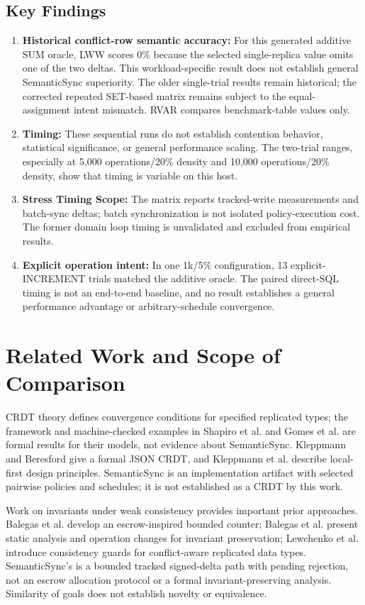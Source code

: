 \documentclass[runningheads]{llncs}
\begin{document}
\subsection{Key Findings}
\begin{enumerate}
\item \textbf{Historical conflict-row semantic accuracy:} For this generated additive SUM oracle, LWW scores 0\% because the selected single-replica value omits one of the two deltas. This workload-specific result does not establish general SemanticSync superiority. The older single-trial results remain historical; the corrected repeated SET-based matrix remains subject to the equal-assignment intent mismatch. RVAR compares benchmark-table values only.
\item \textbf{Timing:} These sequential runs do not establish contention behavior, statistical significance, or general performance scaling. The two-trial ranges, especially at 5,000 operations/20\% density and 10,000 operations/20\% density, show that timing is variable on this host.
\item \textbf{Stress Timing Scope:} The matrix reports tracked-write measurements and batch-sync deltas; batch synchronization is not isolated policy-execution cost. The former domain loop timing is unvalidated and excluded from empirical results.
\item \textbf{Explicit operation intent:} In one 1k/5\% configuration, 13 explicit-INCREMENT trials matched the additive oracle. The paired direct-SQL timing is not an end-to-end baseline, and no result establishes a general performance advantage or arbitrary-schedule convergence.
\end{enumerate}
\section{Related Work and Scope of Comparison}
CRDT theory defines convergence conditions for specified replicated types; the framework and machine-checked examples in Shapiro et al. \cite{shapiro2011} and Gomes et al. \cite{gomes2017} are formal results for their models, not evidence about SemanticSync. Kleppmann and Beresford \cite{kleppmann2017json} give a formal JSON CRDT, and Kleppmann et al. \cite{localfirst2019} describe local-first design principles. SemanticSync is an implementation artifact with selected pairwise policies and schedules; it is not established as a CRDT by this work.

Work on invariants under weak consistency provides important prior approaches. Balegas et al. \cite{balegas2015} develop an escrow-inspired bounded counter; Balegas et al. \cite{balegas2018} present static analysis and operation changes for invariant preservation; Lewchenko et al. \cite{lewchenko2018} introduce consistency guards for conflict-aware replicated data types. SemanticSync's \texttt{} is a bounded tracked signed-delta path with pending rejection, not an escrow allocation protocol or a formal invariant-preserving analysis. Similarity of goals does not establish novelty or equivalence.
\end{document}
